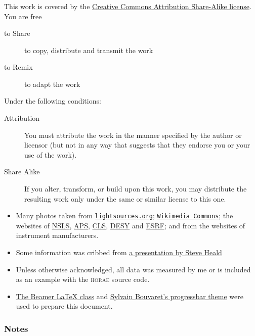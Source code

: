 \documentclass[10pt, xcolor=x11names, compress]{beamer}
\begin{document}
\begin{frame}
  \frametitle{}
  
  \footnotesize
  This work is covered by the
  \href{http://creativecommons.org/licenses/by-sa/3.0/}{\color{Brown4}Creative
    Commons Attribution Share-Alike license}.  You are free
  \begin{description}
  \item[to Share] to copy, distribute and transmit the work
  \item[to Remix] to adapt the work
  \end{description}
  Under the following conditions:
  \begin{description}
  \item[Attribution] You must attribute the work in the manner specified
    by the author or licensor (but not in any way that suggests that
    they endorse you or your use of the work).
  \item[Share Alike] If you alter, transform, or build upon this
    work, you may distribute the resulting work only under the same
    or similar license to this one.
  \end{description}
    
  \bigskip

  \begin{itemize}
  \footnotesize
  \item Many photos taken from \href{http://lightsources.org}%
    {\color{Brown4}\texttt{lightsources.org}};
    \href{http://commons.wikimedia.org}%
    {\color{Brown4}\texttt{Wikimedia Commons}}; the
    websites of %
    \href{http://www.nsls.bnl.gov/} {\color{Brown4}NSLS}, 
    \href{http://www.aps.anl.gov/}  {\color{Brown4}APS}, 
    \href{http://www.lightsource.ca}{\color{Brown4}CLS},
    \href{http://hasylab.desy.de/}  {\color{Brown4}DESY} and
    \href{http://www.esrf.eu/}      {\color{Brown4}ESRF}; and from the
    websites of instrument manufacturers.
  \item Some information was cribbed from 
    \href{http://xafs.org/Workshops/APS2007?action=AttachFile&do=get&target=Heald_Detectors.pdf}
    {\color{Brown4}a presentation by Steve Heald}
  \item Unless otherwise acknowledged, all data was measured by me or
    is included as an example with the \textsc{horae} source code.
  \item \href{http://latex-beamer.sourceforge.net/}%
    {\color{Brown4}The Beamer {\LaTeX} class} and 
    \href{http://recherche.noiraudes.net/fr/LaTeX.php}
    {\color{Brown4}Sylvain Bouvaret's progressbar theme}
    were used to prepare this document.
  \end{itemize}
\end{frame}

\begin{frame}
  \frametitle{Notes}
  
\end{frame}
\end{document}
